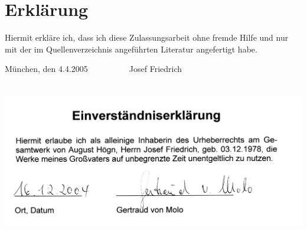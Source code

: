 \section{Erklärung}

Hiermit erkläre ich, dass ich diese Zulassungsarbeit ohne fremde Hilfe
und nur mit der im Quellenverzeichnis angeführten Literatur angefertigt
habe.

München, den 4.4.2005\ \ \ \ \ \ \ \ \ \ Josef Friedrich

\includegraphics[width=15.946cm,height=6.943cm]{pictures/zulassungsarbeit-img124.png}